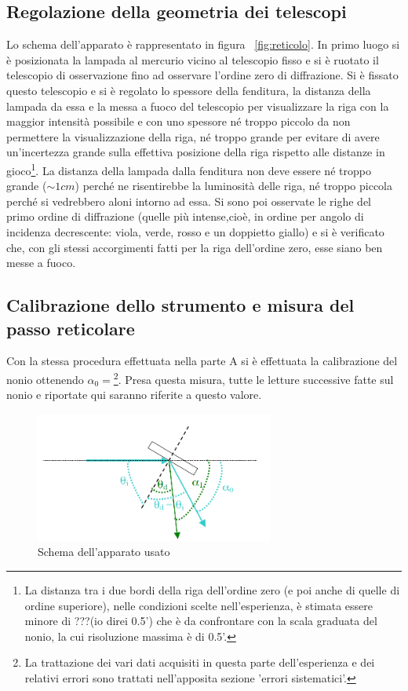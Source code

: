 \documentclass[a4paper,10pt]{article}
\begin{document}
{{{{{{\subsection{Regolazione della geometria dei telescopi}
Lo schema dell'apparato è rappresentato in figura \figurename{~\ref{fig:reticolo}}.
In primo luogo si è posizionata la lampada al mercurio vicino al telescopio fisso e si è ruotato il telescopio di osservazione fino ad osservare l'ordine zero di diffrazione. Si è fissato questo telescopio e si è regolato lo spessore della fenditura, la distanza della lampada da essa e la messa a fuoco del telescopio per visualizzare la riga con la maggior intensità possibile e con uno spessore né troppo piccolo da non permettere la visualizzazione della riga, né troppo grande per evitare di avere un'incertezza grande sulla effettiva posizione della riga rispetto alle distanze in gioco\footnote{La distanza tra i due bordi della riga dell'ordine zero (e poi anche di quelle di ordine superiore), nelle condizioni scelte nell'esperienza, è stimata essere minore di ???(io direi 0.5') che è da confrontare con la scala graduata del nonio, la cui risoluzione massima è di 0.5'.}.
La distanza della lampada dalla fenditura non deve essere né troppo grande ($\sim 1 cm$) perché ne risentirebbe la luminosità delle riga, né troppo piccola perché si vedrebbero aloni intorno ad essa.
Si sono poi osservate le righe del primo ordine di diffrazione (quelle più intense,cioè, in ordine per angolo di incidenza decrescente: viola, verde, rosso e un doppietto giallo) e si è verificato che, con gli stessi accorgimenti fatti per la riga dell'ordine zero, esse siano ben messe a fuoco.

\subsection{Calibrazione dello strumento e misura del passo reticolare}
Con la stessa procedura effettuata nella parte A si è effettuata la calibrazione del nonio ottenendo $\alpha_0 = $\footnote{La trattazione dei vari dati acquisiti in questa parte dell'esperienza e dei relativi errori sono trattati nell'apposita sezione 'errori sistematici'.}. Presa questa misura, tutte le letture successive fatte sul nonio e riportate qui saranno riferite a questo valore.

\begin{figure}[H]
	\centering
	\includegraphics[width=0.7\textwidth]{../grafici/Angoli.png}
	\caption{Schema dell'apparato usato}
	\label{fig:angoli}
\end{figure}

}}}}}}
\end{document}
